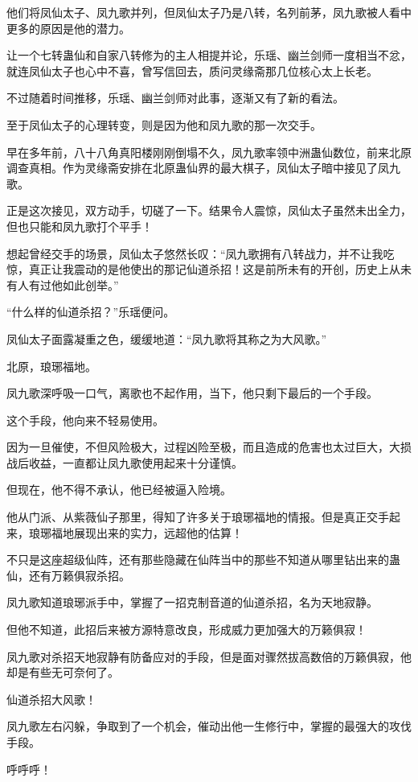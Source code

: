 \begin{this_body}
他们将凤仙太子、凤九歌并列，但凤仙太子乃是八转，名列前茅，凤九歌被人看中更多的原因是他的潜力。

让一个七转蛊仙和自家八转修为的主人相提并论，乐瑶、幽兰剑师一度相当不忿，就连凤仙太子也心中不喜，曾写信回去，质问灵缘斋那几位核心太上长老。

不过随着时间推移，乐瑶、幽兰剑师对此事，逐渐又有了新的看法。

至于凤仙太子的心理转变，则是因为他和凤九歌的那一次交手。

早在多年前，八十八角真阳楼刚刚倒塌不久，凤九歌率领中洲蛊仙数位，前来北原调查真相。作为灵缘斋安排在北原蛊仙界的最大棋子，凤仙太子暗中接见了凤九歌。

正是这次接见，双方动手，切磋了一下。结果令人震惊，凤仙太子虽然未出全力，但也只能和凤九歌打个平手！

想起曾经交手的场景，凤仙太子悠然长叹：“凤九歌拥有八转战力，并不让我吃惊，真正让我震动的是他使出的那记仙道杀招！这是前所未有的开创，历史上从未有人有过他如此创举。”

“什么样的仙道杀招？”乐瑶便问。

凤仙太子面露凝重之色，缓缓地道：“凤九歌将其称之为大风歌。”

北原，琅琊福地。

凤九歌深呼吸一口气，离歌也不起作用，当下，他只剩下最后的一个手段。

这个手段，他向来不轻易使用。

因为一旦催使，不但风险极大，过程凶险至极，而且造成的危害也太过巨大，大损战后收益，一直都让凤九歌使用起来十分谨慎。

但现在，他不得不承认，他已经被逼入险境。

他从门派、从紫薇仙子那里，得知了许多关于琅琊福地的情报。但是真正交手起来，琅琊福地展现出来的实力，远超他的估算！

不只是这座超级仙阵，还有那些隐藏在仙阵当中的那些不知道从哪里钻出来的蛊仙，还有万籁俱寂杀招。

凤九歌知道琅琊派手中，掌握了一招克制音道的仙道杀招，名为天地寂静。

但他不知道，此招后来被方源特意改良，形成威力更加强大的万籁俱寂！

凤九歌对杀招天地寂静有防备应对的手段，但是面对骤然拔高数倍的万籁俱寂，他却是有些无可奈何了。

仙道杀招大风歌！

凤九歌左右闪躲，争取到了一个机会，催动出他一生修行中，掌握的最强大的攻伐手段。

呼呼呼！


\end{this_body}
